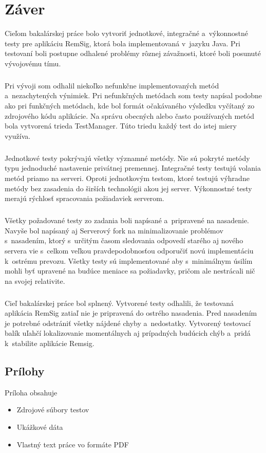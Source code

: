 \documentclass[
  digital, %
  table,   %
oneside,
  nolof,     %
  nolot,     %
]{fithesis3}
\begin{document}
\chapter{Záver}
Cieľom bakalárskej práce bolo vytvoriť jednotkové, integračné a~výkonnostné testy pre aplikáciu RemSig, ktorá bola implementovaná v~jazyku Java. Pri testovaní boli postupne odhalené problémy rôznej závažnosti, ktoré boli posunuté vývojovému tímu. \paragraph{}
Pri vývoji som odhalil niekoľko nefunkčne implementovaných metód a~nezachytených výnimiek. Pri nefunkčných metódach som testy napísal podobne ako pri funkčných metódach, kde bol formát očakávaného výsledku vyčítaný zo zdrojového kódu aplikácie. Na správu obecných alebo často používaných metód bola vytvorená trieda TestManager. Túto triedu každý test do istej miery využíva. \paragraph{}
Jednotkové testy pokrývajú všetky významné metódy. Nie sú pokryté metódy typu jednoduché nastavenie privátnej premennej. Integračné testy testujú volania metód priamo na serveri. Oproti jednotkovým testom, ktoré testujú výhradne metódy bez zasadenia do širších technológii akou jej server. Výkonnostné testy merajú rýchlosť spracovania požiadaviek serverom.\paragraph{}
Všetky požadované testy zo zadania boli napísané a~pripravené na nasadenie. Navyše bol napísaný aj Serverový fork na minimalizovanie problémov s~nasadením, ktorý s~určitým časom sledovania odpovedí starého aj nového servera vie s~celkom veľkou pravdepodobnosťou odporučiť novú implementáciu k~ostrému prevozu. Všetky testy sú  implementované aby s~minimálnym úsilím mohli byť upravené na budúce meniace sa požiadavky, pričom ale nestrácali nič na svojej relativite.\paragraph{}
Cieľ bakalárskej práce bol splnený. Vytvorené testy odhalili, že testovaná aplikácia RemSig zatiaľ nie je pripravená do ostrého nasadenia. Pred nasadením je potrebné odstrániť všetky nájdené chyby a~nedostatky. Vytvorený testovací balík uľahčí lokalizovanie momentálnych aj prípadných budúcich chýb a~pridá k~stabilite aplikácie Remsig.




\printbibliography

  

\begin{appendix}


\chapter{Prílohy}
Príloha obsahuje
\begin{itemize}
	\item Zdrojové súbory testov
	\item Ukážkové dáta 
	\item Vlastný text práce vo formáte PDF
\end{itemize}



\end{appendix}
\end{document}
